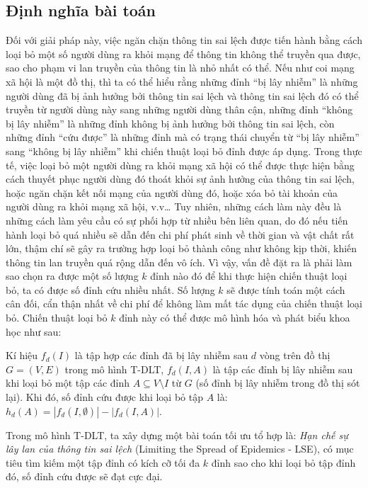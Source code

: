  	\subsection{Định nghĩa bài toán}
 	Đối với giải pháp này, việc ngăn chặn thông tin sai lệch được tiến hành bằng cách loại bỏ một số người dùng ra khỏi mạng để thông tin không thể truyền qua được, sao cho phạm vi lan truyền của thông tin là nhỏ nhất có thể. Nếu như coi mạng xã hội là một đồ thị, thì ta có thể hiểu rằng những đỉnh “bị lây nhiễm” là những người dùng đã bị ảnh hưởng bởi thông tin sai lệch và thông tin sai lệch đó có thể truyền từ người dùng này sang những người dùng thân cận, những đỉnh “không bị lây nhiễm” là những đỉnh không bị ảnh hưởng bởi thông tin sai lệch, còn những đỉnh “cứu được” là những đỉnh mà có trạng thái chuyển từ “bị lây nhiễm” sang “không bị lây nhiễm” khi chiến thuật loại bỏ đỉnh được áp dụng. Trong thực tế, việc loại bỏ một người dùng ra khỏi mạng xã hội có thể được thực hiện bằng cách thuyết phục người dùng đó thoát khỏi sự ảnh hưởng của thông tin sai lệch, hoặc ngăn chặn kết nối mạng của người dùng đó, hoặc xóa bỏ tài khoản của người dùng ra khỏi mạng xã hội, v.v… Tuy nhiên, những cách làm này đều là những cách làm yêu cầu có sự phối hợp từ nhiều bên liên quan, do đó nếu tiến hành loại bỏ quá nhiều sẽ dẫn đến chi phí phát sinh về thời gian và vật chất rất lớn, thậm chí sẽ gây ra trường hợp loại bỏ thành công như không kịp thời, khiến thông tin lan truyền quá rộng dẫn đến vô ích. Vì vậy, vấn đề đặt ra là phải làm sao chọn ra được một số lượng $k$ đỉnh nào đó để khi thực hiện chiến thuật loại bỏ, ta có được số đỉnh cứu nhiều nhất. Số lượng $k$ sẽ được tính toán một cách cân đối, cẩn thận nhất về chi phí để không làm mất tác dụng của chiến thuật loại bỏ. Chiến thuật loại bỏ $k$ đỉnh này có thể được mô hình hóa và phát biểu khoa học như sau:  
 	
 	Kí hiệu $f_{d}(I)$ là tập hợp các đỉnh đã bị lây nhiễm sau $d$ vòng trên đồ thị $G = (V,E)$ trong mô hình T-DLT, $f_{d}(I,A)$ là tập các đỉnh bị lây nhiễm sau khi loại bỏ một tập các đỉnh $A \subseteq V \setminus I$ từ $G$ (số đỉnh bị lây nhiễm trong đồ thị sót lại). Khi đó, số đỉnh cứu được khi loại bỏ tập $A$ là: $h_{d}(A)=| f_{d}(I,\emptyset)|-|f_{d}(I,A)|$.
 	
 	Trong mô hình T-DLT, ta xây dựng một bài toán tối ưu tổ hợp là: {\itshape Hạn chế sự lây lan của thông tin sai lệch} (Limiting the Spread of Epidemics - LSE), có mục tiêu tìm kiếm một tập đỉnh có kích cỡ tối đa $k$ đỉnh sao cho khi loại bỏ tập đỉnh đó, số đỉnh cứu được sẽ đạt cực đại.  
 	
